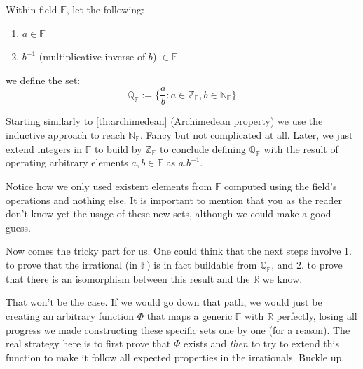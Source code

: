 \begin{definition}
Within field $\mathbb{F}$, let the following:
\begin{enumerate}
\item $a \in \mathbb{F}$
\item $b^{-1}$ (multiplicative inverse of $b$) $\in \mathbb{F}$
\end{enumerate} we define the set:
$$\mathbb{Q_F} := \{\frac{a}{b}: a \in \mathbb{Z_F}, b \in \mathbb{N_F}\}$$
\end{definition}

Starting similarly to \cref{th:archimedean} (Archimedean property) we use the inductive approach to reach $\mathbb{N_F}$. Fancy but not complicated at all. Later, we just extend integers in $\mathbb{F}$ to build by $\mathbb{Z_F}$ to conclude defining $\mathbb{Q_F}$ with the result of operating arbitrary elements $a, b \in \mathbb{F}$ as $a.b^{-1}$.

Notice how we only used existent elements from $\mathbb{F}$ computed using the field's operations and nothing else. It is important to mention that you as the reader don't know yet the usage of these new sets, although we could make a good guess.

Now comes the tricky part for us. One could think that the next steps involve 1. to prove that the irrational (in $\mathbb{F}$) is in fact buildable from $\mathbb{Q_F}$, and 2. to prove that there is an isomorphism between this result and the $\mathbb{R}$ we know.

That won't be the case. If we would go down that path, we would just be creating an arbitrary function $\Phi$ that maps a generic $\mathbb{F}$ with $\mathbb{R}$ perfectly, losing all progress we made constructing these specific sets one by one (for a reason). The real strategy here is to first prove that $\Phi$ exists and \textit{then} to try to extend this function to make it follow all expected properties in the irrationals. Buckle up.
